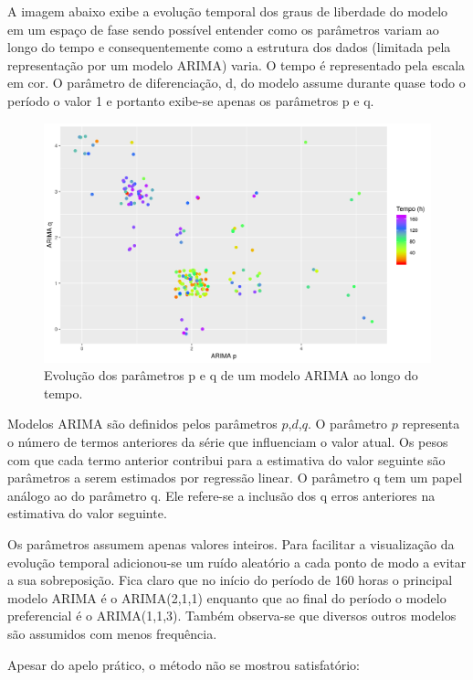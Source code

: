 \documentclass[
	12pt,				%
	openright,			%
	oneside,			%
	a4paper,			%
	english,			%
	french,				%
	spanish,			%
	brazil				%
	]{abntex2}
\begin{document}
A imagem abaixo exibe a evolução temporal dos graus de liberdade do modelo em um espaço de fase sendo possível entender como os parâmetros variam ao longo do tempo e consequentemente como a estrutura dos dados (limitada pela representação por um modelo ARIMA) varia. O tempo é representado pela escala em cor. O parâmetro de diferenciação, d, do modelo assume durante quase todo o período o valor 1 e portanto exibe-se apenas os parâmetros p e q.

\begin{figure}[h]
    \centering
	\includegraphics[width=\textwidth]{var_arima}
	\caption{Evolução dos parâmetros p e q de um modelo ARIMA ao longo do tempo.}
\end{figure}
\FloatBarrier

Modelos ARIMA são definidos pelos parâmetros $p$,$d$,$q$. O parâmetro $p$ representa o número de termos anteriores da série que influenciam o valor atual. Os pesos com que cada termo anterior contribui para a estimativa do valor seguinte são parâmetros a serem estimados por regressão linear.
O parâmetro q tem um papel análogo ao do parâmetro q. Ele refere-se a inclusão dos q erros anteriores na estimativa do valor seguinte.

Os parâmetros assumem apenas valores inteiros. Para facilitar a visualização da evolução temporal adicionou-se um ruído aleatório a cada ponto de modo a evitar a sua sobreposição. Fica claro que no início do período de 160 horas o principal modelo ARIMA é o ARIMA(2,1,1) enquanto que ao final do período o modelo preferencial é o ARIMA(1,1,3). Também observa-se que diversos outros modelos são assumidos com menos frequência.

Apesar do apelo prático, o método não se mostrou satisfatório:
\end{document}
